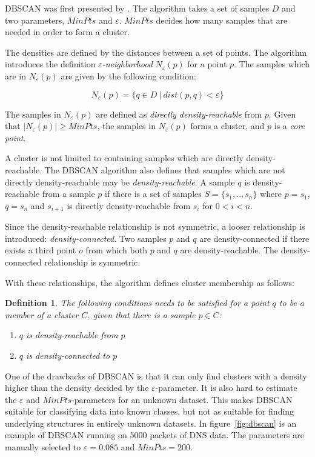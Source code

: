 \documentclass[a4paper]{report}
\newtheorem*{definition}{Definition}
\begin{document}
DBSCAN was first presented by \citet{ester96}. The algorithm takes a set of 
samples $D$ and two parameters, $MinPts$ and $\varepsilon$. $MinPts$ decides
how many samples that are needed in order to form a cluster.

The densities are defined by the distances between a set of points.
The algorithm introduces the definition \emph{$\varepsilon$-neighborhood}
$N_{\varepsilon}(p)$ for a point $p$. The samples which are in 
$N_{\varepsilon}(p)$ are given by the following condition:

\begin{equation}
    N_{\varepsilon}(p) = \{ q \in D ~|~ dist(p,q) < \varepsilon  \}
    \label{eq:eps}
\end{equation}

The samples in $N_{\varepsilon}(p)$ are defined as
\emph{directly density-reachable} from $p$. Given that
$|N_{\varepsilon}(p)| \ge MinPts$, the samples in $N_{\varepsilon}(p)$ forms a
cluster, and $p$ is a \emph{core point}.

A cluster is not limited to containing samples which are directly
density-reachable. The DBSCAN algorithm also defines that samples which are
not directly density-reachable may be \emph{density-reachable}.
A sample $q$ is density-reachable from a sample $p$ if there is a set of samples
$S = \{s_1, .., s_n\}$ where $p = s_1$, $q = s_n$ and $s_{i+1}$ is directly
density-reachable from $s_i$ for $0 < i < n$.

Since the density-reachable relationship is not symmetric, a looser
relationship is introduced: \emph{density-connected}. Two samples $p$ and
$q$ are density-connected if there exists a third point $o$ from which both
$p$ and $q$ are density-reachable. The density-connected relationship
is symmetric.

With these relationships, the algorithm defines cluster membership as
follows:

\begin{definition}
    The following conditions needs to be satisfied for a point $q$ to be a
    member of a cluster $C$, given that there is a sample $p \in C$:
    \begin{enumerate}
        \item $q$ is density-reachable from $p$
        \item $q$ is density-connected to $p$
    \end{enumerate}
\end{definition}

One of the drawbacks of DBSCAN is that it can only find clusters with a density
higher than the density decided by the $\varepsilon$-parameter. It is also hard
to estimate the $\varepsilon$ and $MinPts$-parameters for an unknown dataset.
This makes DBSCAN suitable for classifying data into known classes, but not as
suitable for finding underlying structures in entirely unknown datasets. In
figure~\ref{fig:dbscan} is an example of DBSCAN running on 5000 packets of DNS
data. The parameters are manually selected to $\varepsilon = 0.085$ and
$MinPts = 200$.
\end{document}
